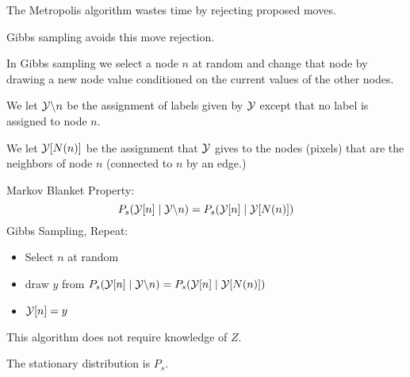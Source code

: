 {

The Metropolis algorithm wastes time by rejecting proposed moves.

\vfill
Gibbs sampling avoids this move rejection.

\vfill
In Gibbs sampling we select a node $n$ at random and change that node by drawing a new node value conditioned on the current values of the other nodes.

\vfill
We let {\color{red} ${\cal Y} \backslash n$} be the assignment of labels given by ${\cal Y}$ except that no label is assigned to node $n$.

\vfill
We let {\color{red} ${\cal Y}[N(n)]$} be the assignment that ${\cal Y}$ gives to the nodes (pixels) that are the neighbors of node $n$ (connected to $n$ by an edge.)


Markov Blanket Property:
{\color{red} $$P_s({\cal Y}[n] \;|\;{\cal Y} \backslash n) = P_s({\cal Y}[n] \;|\; {\cal Y}[N(n)])$$}
\vfill
Gibbs Sampling, Repeat:

\begin{itemize}
\item   Select $n$ at random

\item {\color{red} draw $y$ from $P_s({\cal Y}[n]\;|\;{\cal Y} \backslash n) = P_s({\cal Y}[n] \;|\;{\cal Y}[N(n)])$}

\item ${\cal Y}[n] = y$
\end{itemize}

\vfill
This algorithm does not require knowledge of $Z$.

\vfill
The stationary distribution is $P_s$.


}



